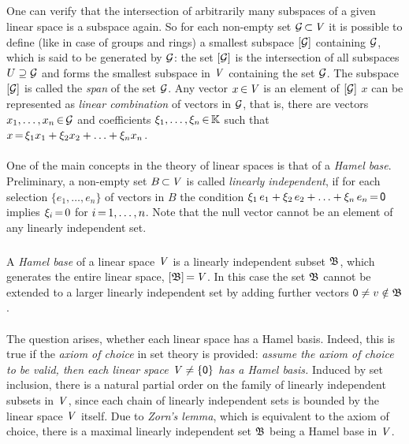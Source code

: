 \documentclass[11pt,twoside]{article}
\begin{document}
\subparagraph{}
One can verify
that the intersection of arbitrarily many subspaces of a given linear space
is a subspace again.
So for each non-empty set ${\mathcal{G}} {\,\subset\,} \mathit{V}$
it is possible to define (like in case of groups and rings)
a smallest subspace $[{\mathcal{G}}]$ containing ${\mathcal{G}}$,
which is said to be generated by ${\mathcal{G}}$:
the set $[{\mathcal{G}}]$ is the intersection of all subspaces $U \supseteq {\mathcal{G}}$
and forms the smallest subspace in $\mathit{V}$ containing the set ${\mathcal{G}}$.
The subspace $[{\mathcal{G}}]$ is called the \textit{span} of the set ${\mathcal{G}}$.
Any vector $x {\,\in\,} \mathit{V}$ is an element of $[{\mathcal{G}}]$
\iff
$x$ can be represented as \textit{linear combination} of vectors in ${\mathcal{G}}$,
that is, there are vectors $x_1,\ldots,x_n {\,\in\,} {\mathcal{G}}$ and
coefficients $\xi_1,\ldots,\xi_n {\,\in\,} {\mathbb{K}}$ such that
$x {\,=\,} \xi_1 x_1 + \xi_2 x_2 + \ldots + \xi_n x_n$.

\paragraph{} %
One of the main concepts in the theory of linear spaces
is that of a \textit{Hamel base}.
Preliminary,
a non-empty set $B {\,\subset\,} \mathit{V}$ is called \textit{linearly independent},
if for each selection $\{e_1,\ldots,e_n\}$ of vectors in $B$
the condition
$\xi_1 \, e_1 + \xi_2 \, e_2 + \ldots + \xi_n \, e_n {\,=\,} {\mathsf{0}}$ implies
$\xi_i {\,=\,} 0$ for $i {\,=\,} 1,\ldots,n$.
Note
that the null vector cannot be an element of any linearly independent set.

\subparagraph{}
A \textit{Hamel base} of a linear space $\mathit{V}$ is
a linearly independent subset $\mathfrak{B}$,
which generates the entire linear space,
{\ie} $[\mathfrak{B}] {\,=\,} \mathit{V}$.
In this case the set $\mathfrak{B}$ cannot be extended to a larger linearly
independent set by adding further vectors ${\mathsf{0}} \neq v \notin \mathfrak{B}$.

\paragraph{}
The question arises,
whether each linear space has a Hamel basis.
Indeed,
this is true if the \textit{axiom of choice} in set theory is provided:
\textit{assume the axiom of choice to be valid,
then each linear space $\mathit{V} \neq \{{\mathsf{0}}\}$ has a Hamel basis.}
Induced by set inclusion,
there is a natural partial order on the family
of linearly independent subsets in $\mathit{V}$,
since each chain of linearly independent sets is bounded
by the linear space $\mathit{V}$ itself.
Due to \textit{Zorn's lemma},
which is equivalent to the axiom of choice,
there is a maximal linearly independent set $\mathfrak{B}$
being a Hamel base in $\mathit{V}$.
\end{document}
